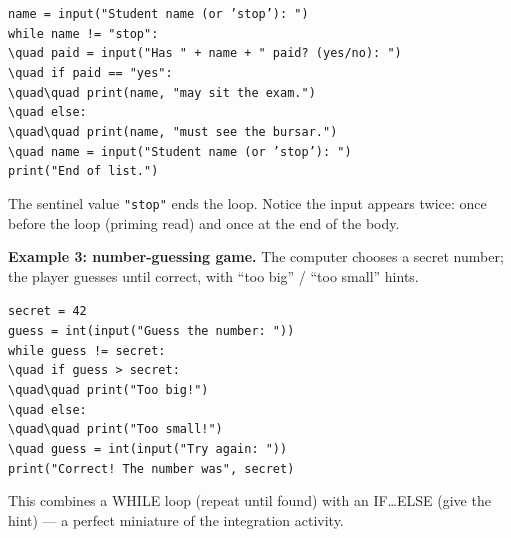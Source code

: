 \documentclass[11pt]{article}
\begin{document}
\begin{exemplebox}
\begin{flushleft}
\texttt{name = input("Student name (or 'stop'): ")}\\
\texttt{while name != "stop":}\\
\texttt{\textbackslash{}quad paid = input("Has " + name + " paid? (yes/no): ")}\\
\texttt{\textbackslash{}quad if paid == "yes":}\\
\texttt{\textbackslash{}quad\textbackslash{}quad print(name, "may sit the exam.")}\\
\texttt{\textbackslash{}quad else:}\\
\texttt{\textbackslash{}quad\textbackslash{}quad print(name, "must see the bursar.")}\\
\texttt{\textbackslash{}quad name = input("Student name (or 'stop'): ")}\\
\texttt{print("End of list.")}
\end{flushleft}
The sentinel value \texttt{"stop"} ends the loop. Notice the input appears twice: once before the loop (priming read) and once at the end of the body.
\end{exemplebox}

\textbf{Example 3: number-guessing game.} The computer chooses a secret number; the player guesses until correct, with ``too big'' / ``too small'' hints.

\begin{exemplebox}
\begin{flushleft}
\texttt{secret = 42}\\
\texttt{guess = int(input("Guess the number: "))}\\
\texttt{while guess != secret:}\\
\texttt{\textbackslash{}quad if guess > secret:}\\
\texttt{\textbackslash{}quad\textbackslash{}quad print("Too big!")}\\
\texttt{\textbackslash{}quad else:}\\
\texttt{\textbackslash{}quad\textbackslash{}quad print("Too small!")}\\
\texttt{\textbackslash{}quad guess = int(input("Try again: "))}\\
\texttt{print("Correct! The number was", secret)}
\end{flushleft}
This combines a WHILE loop (repeat until found) with an IF\ldots ELSE (give the hint) --- a perfect miniature of the integration activity.
\end{exemplebox}
\end{document}
